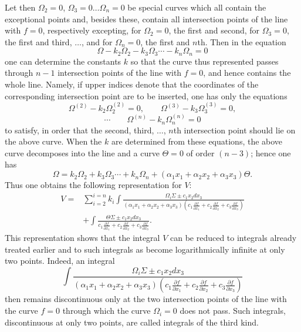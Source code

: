 \documentclass[10pt]{article}
\begin{document}
Let then $\Omega_2=0$, $\Omega_3=0\ldots\Omega_n=0$ be special curves which all contain the exceptional points and, besides these, contain all intersection points of the line with $f=0$, respectively excepting, for $\Omega_2=0$, the first and second, for $\Omega_3=0$, the first and third, $\ldots$, and for $\Omega_n=0$, the first and $n$th. Then in the equation
\[
\Omega-k_2\Omega_2-k_3\Omega_3\cdots-k_n\Omega_n=0
\]
one can determine the constants $k$ so that the curve thus represented passes through $n-1$ intersection points of the line with $f=0$, and hence contains the whole line. Namely, if upper indices denote that the coordinates of the corresponding intersection point are to be inserted, one has only the equations
\[
\Omega^{(2)}-k_2\Omega_2^{(2)}=0,
\qquad
\Omega^{(3)}-k_3\Omega_3^{(3)}=0,
\]
\[
\cdots
\qquad
\Omega^{(n)}-k_n\Omega_n^{(n)}=0
\]
to satisfy, in order that the second, third, $\ldots$, $n$th intersection point should lie on the above curve. When the $k$ are determined from these equations, the above curve decomposes into the line and a curve $\Theta=0$ of order $(n-3)$; hence one has
\[
\Omega=k_2\Omega_2+k_3\Omega_3\cdots+k_n\Omega_n+(\alpha_1x_1+\alpha_2x_2+\alpha_3x_3)\Theta.
\]
Thus one obtains the following representation for $V$:
\[
\begin{aligned}
V={}&\sum_{i=2}^{i=n}k_i\int
\frac{\Omega_i\Sigma\pm c_1x_2dx_3}{(\alpha_1x_1+\alpha_2x_2+\alpha_3x_3)\left(c_1\frac{\partial f}{\partial x_1}+c_2\frac{\partial f}{\partial x_2}+c_3\frac{\partial f}{\partial x_3}\right)}\\
&+\int\frac{\Theta\Sigma\pm c_1x_2dx_3}{c_1\frac{\partial f}{\partial x_1}+c_2\frac{\partial f}{\partial x_2}+c_3\frac{\partial f}{\partial x_3}}.
\end{aligned}
\]
This representation shows that the integral $V$ can be reduced to integrals already treated earlier and to such integrals as become logarithmically infinite at only two points. Indeed, an integral
\[
\int\frac{\Omega_i\Sigma\pm c_1x_2dx_3}{(\alpha_1x_1+\alpha_2x_2+\alpha_3x_3)\left(c_1\frac{\partial f}{\partial x_1}+c_2\frac{\partial f}{\partial x_2}+c_3\frac{\partial f}{\partial x_3}\right)}
\]
then remains discontinuous only at the two intersection points of the line with the curve $f=0$ through which the curve $\Omega_i=0$ does not pass. Such integrals, discontinuous at only two points, are called integrals of the third kind.
\end{document}
